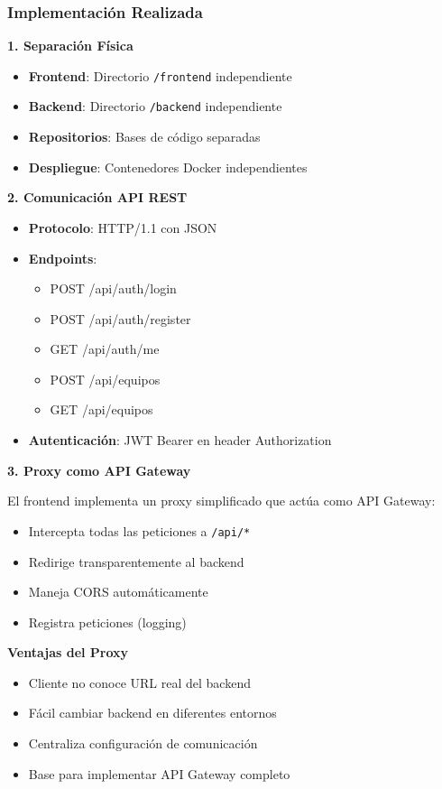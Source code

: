 \documentclass[12pt,a4paper]{article}
\begin{document}
\subsubsection{Implementación Realizada}

\textbf{1. Separación Física}

\begin{itemize}
    \item \textbf{Frontend}: Directorio \texttt{/frontend} independiente
    \item \textbf{Backend}: Directorio \texttt{/backend} independiente
    \item \textbf{Repositorios}: Bases de código separadas
    \item \textbf{Despliegue}: Contenedores Docker independientes
\end{itemize}

\textbf{2. Comunicación API REST}

\begin{itemize}
    \item \textbf{Protocolo}: HTTP/1.1 con JSON
    \item \textbf{Endpoints}:
    \begin{itemize}
        \item POST /api/auth/login
        \item POST /api/auth/register
        \item GET /api/auth/me
        \item POST /api/equipos
        \item GET /api/equipos
    \end{itemize}
    \item \textbf{Autenticación}: JWT Bearer en header Authorization
\end{itemize}

\textbf{3. Proxy como API Gateway}

El frontend implementa un proxy simplificado que actúa como API Gateway:

\begin{itemize}
    \item Intercepta todas las peticiones a \texttt{/api/*}
    \item Redirige transparentemente al backend
    \item Maneja CORS automáticamente
    \item Registra peticiones (logging)
\end{itemize}

\textbf{Ventajas del Proxy}
\begin{itemize}
    \item Cliente no conoce URL real del backend
    \item Fácil cambiar backend en diferentes entornos
    \item Centraliza configuración de comunicación
    \item Base para implementar API Gateway completo
\end{itemize}
\end{document}
